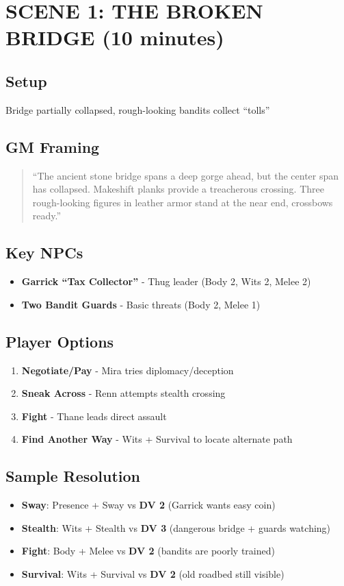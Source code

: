 \documentclass[12pt]{article}
\newcommand{\dv}[1]{\textbf{DV #1}}
\begin{document}
\section{SCENE 1: THE BROKEN BRIDGE (10 minutes)}

\subsection*{Setup}
Bridge partially collapsed, rough-looking bandits collect ``tolls''

\subsection*{GM Framing}
\begin{quote}
``The ancient stone bridge spans a deep gorge ahead, but the center span has collapsed. Makeshift planks provide a treacherous crossing. Three rough-looking figures in leather armor stand at the near end, crossbows ready.''
\end{quote}

\subsection*{Key NPCs}
\begin{itemize}
\item \textbf{Garrick ``Tax Collector''} - Thug leader (Body 2, Wits 2, Melee 2)
\item \textbf{Two Bandit Guards} - Basic threats (Body 2, Melee 1)
\end{itemize}

\subsection*{Player Options}
\begin{enumerate}
\item \textbf{Negotiate/Pay} - Mira tries diplomacy/deception
\item \textbf{Sneak Across} - Renn attempts stealth crossing  
\item \textbf{Fight} - Thane leads direct assault
\item \textbf{Find Another Way} - Wits + Survival to locate alternate path
\end{enumerate}

\subsection*{Sample Resolution}
\begin{itemize}
\item \textbf{Sway}: Presence + Sway vs \dv{2} (Garrick wants easy coin)
\item \textbf{Stealth}: Wits + Stealth vs \dv{3} (dangerous bridge + guards watching)
\item \textbf{Fight}: Body + Melee vs \dv{2} (bandits are poorly trained)
\item \textbf{Survival}: Wits + Survival vs \dv{2} (old roadbed still visible)
\end{itemize}
\end{document}
